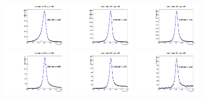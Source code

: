 \documentclass[thesis.tex]{subfiles}
\renewcommand\_{\textunderscore\allowbreak}
\begin{document}
\begin{figure}[hbtp]
  \centering
   \includegraphics[width=0.31\textwidth]{Figures/Bw_ker_pt_num_35_40.pdf}   \includegraphics[width=0.31\textwidth]{Figures/Bw_ker_pt_num_40_45.pdf}  \includegraphics[width=0.31\textwidth]{Figures/Bw_ker_pt_num_45_50.pdf} \\
  \includegraphics[width=0.31\textwidth]{Figures/Bw_ker_pt_num_50_55.pdf}    \includegraphics[width=0.31\textwidth]{Figures/Bw_ker_pt_num_55_60.pdf}   \includegraphics[width=0.31\textwidth]{Figures/Bw_ker_pt_num_60_65.pdf} \\

\end{figure}
\end{document}
